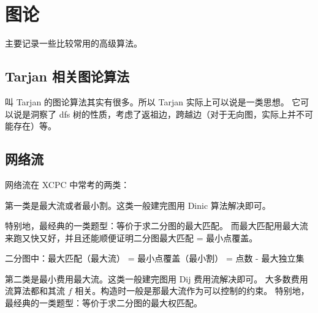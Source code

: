 \chapter{图论}

主要记录一些比较常用的高级算法。

\section{Tarjan 相关图论算法}

叫 Tarjan 的图论算法其实有很多。所以 Tarjan 实际上可以说是一类思想。
它可以说是洞察了 dfs 树的性质，考虑了返祖边，跨越边（对于无向图，实际上并不可能存在）等。



\section{网络流}

网络流在 XCPC 中常考的两类：

第一类是最大流或者最小割。这类一般建完图用 Dinic 算法解决即可。

特别地，最经典的一类题型：等价于求二分图的最大匹配。
而最大匹配用最大流来跑又快又好，并且还能顺便证明二分图最大匹配 = 最小点覆盖。

二分图中：最大匹配（最大流） = 最小点覆盖（最小割） = 点数 - 最大独立集

第二类是最小费用最大流。这类一般建完图用 Dij 费用流解决即可。
大多数费用流算法都和其流 $f$ 相关。构造时一般是那最大流作为可以控制的约束。
特别地，最经典的一类题型：等价于求二分图的最大权匹配。


